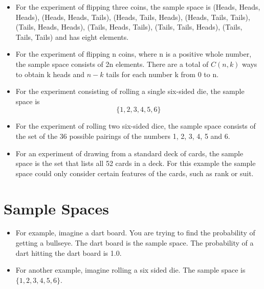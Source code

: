 \documentclass[]{report}
\begin{document}
{ 
\begin{itemize}

\item For the experiment of flipping three coins, the sample space is {(Heads, Heads, Heads), (Heads, Heads, Tails), (Heads, Tails, Heads), (Heads, Tails, Tails), (Tails, Heads, Heads), (Tails, Heads, Tails), (Tails, Tails, Heads), (Tails, Tails, Tails) } and has eight elements.


\item For the experiment of flipping n coins, where n is a positive whole number, the sample space consists of 2n elements. There are a total of $C(n, k)$ ways to obtain k heads and $n - k$ tails for each number k from 0 to n.

\item For the experiment consisting of rolling a single six-sided die, the sample space is 
\[\{1, 2, 3, 4, 5, 6\} \]
\end{itemize}
\smallskip
\begin{itemize}
\item For the experiment of rolling two six-sided dice, the sample space consists of the set of the 36 possible pairings of the numbers 1, 2, 3, 4, 5 and 6.
\item For an experiment of drawing from a standard deck of cards, the sample space is the set that lists all 52 cards in a deck. For this example the sample space could only consider certain features of the cards, such as rank or suit.
\end{itemize}


\section{Sample Spaces}

\begin{itemize}
\itemA complete list of all possible outcomes of a random experiment is called \textbf{sample space }or possibility space and is denoted by $\mathcal{S}$.


\itemA sample space is a set or collection of outcome of a particular random experiment.

\item For example, imagine a dart board. You are trying to find the probability of getting a bullseye. The dart board is the sample space. The probability of a dart hitting the dart board is 1.0.
\item For another example, imagine rolling a six sided die. The sample space is $\{1, 2, 3, 4, 5, 6\}$.
\end{itemize}

}
\end{document}
